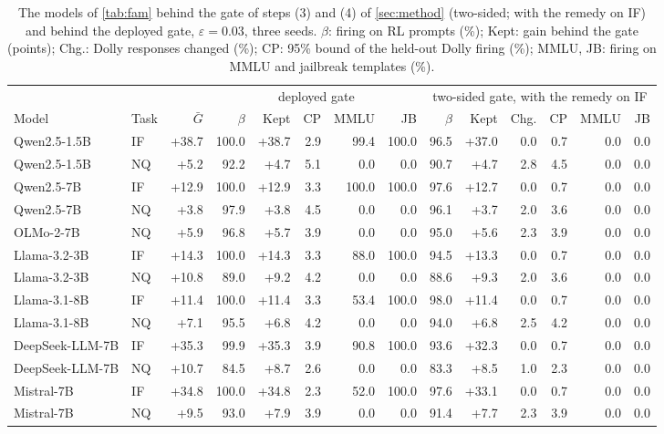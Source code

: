 \begin{table}[t]
\centering
\scriptsize
\setlength{\tabcolsep}{2.6pt}
\caption{The models of \cref{tab:fam} behind the gate of steps (3) and (4) of \cref{sec:method} (two-sided; with the
remedy on IF) and behind the deployed gate, $\varepsilon=0.03$, three seeds. $\beta$: firing on RL prompts (\%); Kept:
gain behind the gate (points); Chg.: Dolly responses changed (\%); CP: 95\% bound of the held-out Dolly firing (\%);
MMLU, JB: firing on MMLU and jailbreak templates (\%).}
\label{tab:famrec}
\begin{tabular}{l l r rrrrr rrrrrr}
\toprule
 & & & \multicolumn{5}{c}{deployed gate} & \multicolumn{6}{c}{two-sided gate, with the remedy on IF} \\
\cmidrule(lr){4-8}\cmidrule(lr){9-14}
Model & Task & $\bar G$ & $\beta$ & Kept & CP & MMLU & JB & $\beta$ & Kept & Chg. & CP & MMLU & JB \\
\midrule
Qwen2.5-1.5B & IF & +38.7 & 100.0 & +38.7 & 2.9 & 99.4 & 100.0 & 96.5 & +37.0 & 0.0 & 0.7 & 0.0 & 0.0 \\
Qwen2.5-1.5B & NQ & +5.2 & 92.2 & +4.7 & 5.1 & 0.0 & 0.0 & 90.7 & +4.7 & 2.8 & 4.5 & 0.0 & 0.0 \\
Qwen2.5-7B & IF & +12.9 & 100.0 & +12.9 & 3.3 & 100.0 & 100.0 & 97.6 & +12.7 & 0.0 & 0.7 & 0.0 & 0.0 \\
Qwen2.5-7B & NQ & +3.8 & 97.9 & +3.8 & 4.5 & 0.0 & 0.0 & 96.1 & +3.7 & 2.0 & 3.6 & 0.0 & 0.0 \\
OLMo-2-7B & NQ & +5.9 & 96.8 & +5.7 & 3.9 & 0.0 & 0.0 & 95.0 & +5.6 & 2.3 & 3.9 & 0.0 & 0.0 \\
Llama-3.2-3B & IF & +14.3 & 100.0 & +14.3 & 3.3 & 88.0 & 100.0 & 94.5 & +13.3 & 0.0 & 0.7 & 0.0 & 0.0 \\
Llama-3.2-3B & NQ & +10.8 & 89.0 & +9.2 & 4.2 & 0.0 & 0.0 & 88.6 & +9.3 & 2.0 & 3.6 & 0.0 & 0.0 \\
Llama-3.1-8B & IF & +11.4 & 100.0 & +11.4 & 3.3 & 53.4 & 100.0 & 98.0 & +11.4 & 0.0 & 0.7 & 0.0 & 0.0 \\
Llama-3.1-8B & NQ & +7.1 & 95.5 & +6.8 & 4.2 & 0.0 & 0.0 & 94.0 & +6.8 & 2.5 & 4.2 & 0.0 & 0.0 \\
DeepSeek-LLM-7B & IF & +35.3 & 99.9 & +35.3 & 3.9 & 90.8 & 100.0 & 93.6 & +32.3 & 0.0 & 0.7 & 0.0 & 0.0 \\
DeepSeek-LLM-7B & NQ & +10.7 & 84.5 & +8.7 & 2.6 & 0.0 & 0.0 & 83.3 & +8.5 & 1.0 & 2.3 & 0.0 & 0.0 \\
Mistral-7B & IF & +34.8 & 100.0 & +34.8 & 2.3 & 52.0 & 100.0 & 97.6 & +33.1 & 0.0 & 0.7 & 0.0 & 0.0 \\
Mistral-7B & NQ & +9.5 & 93.0 & +7.9 & 3.9 & 0.0 & 0.0 & 91.4 & +7.7 & 2.3 & 3.9 & 0.0 & 0.0 \\
\bottomrule
\end{tabular}
\end{table}
